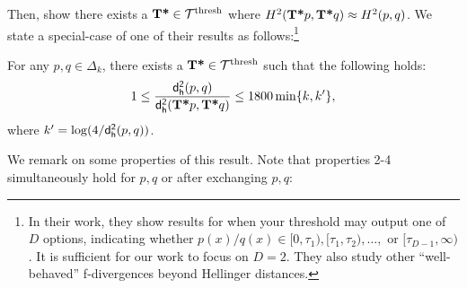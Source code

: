 Then, \cite{pensia2023communication} show there exists a $\textbf{T*} \in \mathcal{T}^{\operatorname{thresh}}$ where $H^2(\textbf{T*} p, \textbf{T*} q) \approx H^2(p,q)$. We state a special-case of one of their results as follows:\footnote{In their work, they show results for when your threshold may output one of $D$ options, indicating whether $p(x)/q(x) \in [0,\tau_1), [\tau_1,\tau_2),\dots, \textrm{ or } [\tau_{D-1},\infty)$. It is sufficient for our work to focus on $D=2$. They also study other ``well-behaved'' f-divergences beyond Hellinger distances.}
\begin{theorem}\label{thm:og-thresh}
    For any $p,q \in \Delta_k$, there exists a $\textbf{T*} \in \mathcal{T}^{\operatorname{thresh}}$ such that the following holds:
    \begin{equation}
        1 \le \frac{\mathsf{d_{h}^2}(p,q)}{\mathsf{d_{h}^2}(\textbf{T*} p, \textbf{T*} q)} \le 1800 \min\{k, k' \},
    \end{equation}
    where $k' = \log(4/\mathsf{d_{h}^2}(p,q))$.
\end{theorem}

We remark on some properties of this result. Note that properties 2-4 simultaneously hold for $p,q$ or after exchanging $p,q$:

